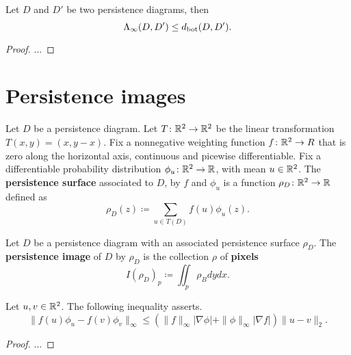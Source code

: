 \begin{theorem}
    Let $ D $ and $ D' $ be two persistence diagrams, then
    \begin{equation}
        \Lambda_\infty(D, D') \leq d_{\operatorname{bot}}(D, D').
    \end{equation}
\end{theorem}
\begin{proof}
    ...
\end{proof}


\section{Persistence images}
\begin{definition}
    Let $ D $ be a persistence diagram. Let $ T \colon \mathbb R^2 \to \mathbb R^2 $ be the linear transformation $ T(x, y) = (x, y-x) $. Fix a nonnegative weighting function $ f \colon \mathbb R^2 \to R $ that is zero along the horizontal axis, continuous and picewise differentiable. Fix a differentiable probability distribution $ \phi_u \colon \mathbb R^2 \to \mathbb R $, with mean $ u \in \mathbb R^2 $. The {\bf persistence surface} associated to $ D $, by $ f $ and $ \phi_u $ is a function $ \rho_D \colon \mathbb R^2 \to \mathbb R $ defined as
    \begin{equation}
        \rho_D(z) \coloneq \sum_{u \in T(D)} f(u) \phi_u(z).
    \end{equation}
\end{definition}

\begin{definition}
    Let $ D $ be a persistence diagram with an associated persistence surface $ \rho_D $. The {\bf persistence image} of $ D $ by $ \rho_D $ is the collection $ \rho $ of {\bf pixels}
    \begin{equation}
        I(\rho_D)_p \coloneq \iint_p \rho_B dy dx.
    \end{equation}
\end{definition}

\begin{lemma}
    Let $ u, v \in \mathbb R^2 $. The following inequality asserts.
    \begin{equation}
        \|f(u) \phi_u - f(v)\phi_v \|_\infty \leq (\|f\|_\infty |\nabla \phi| + \|\phi\|_\infty |\nabla f |) \| u - v \|_2.
    \end{equation}
\end{lemma}
\begin{proof}
    ...
\end{proof}


